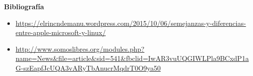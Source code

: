 \documentclass[11pt, a4paper]{report}
\begin{document}
\newpage

\textbf{Bibliografía} \\

\begin{itemize}

\item \url{https://elrincndemanu.wordpress.com/2015/10/06/semejanzas-y-diferencias-entre-apple-microsoft-y-linux/}
\item \url{http://www.somoslibres.org/modules.php?name=News&file=article&sid=541&fbclid=IwAR3vuUQGIWLPla9BCxdP1aG-szEapfJcUQA3vARyTbAnucrMqdrT0O9ya50}
\end{itemize}
\end{document}
